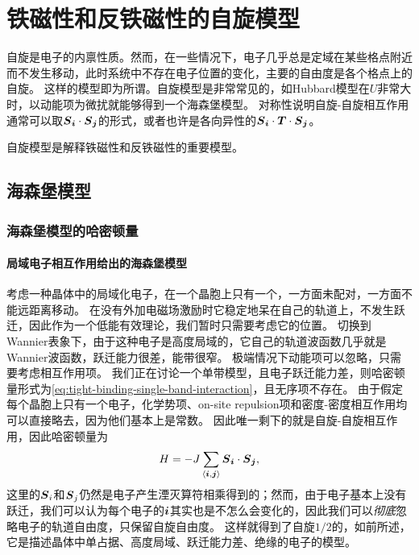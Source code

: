 \chapter{铁磁性和反铁磁性的自旋模型}\label{chap:magnetic}

自旋是电子的内禀性质。然而，在一些情况下，电子几乎总是定域在某些格点附近而不发生移动，此时系统中不存在电子位置的变化，主要的自由度是各个格点上的自旋。
这样的模型即为所谓。自旋模型是非常常见的，如Hubbard模型在$U$非常大时，以动能项为微扰就能够得到一个海森堡模型。
对称性说明自旋-自旋相互作用通常可以取$\vb*{S}_{\vb*{i}} \cdot \vb*{S}_{\vb*{j}}$的形式，或者也许是各向异性的$\vb*{S}_{\vb*{i}} \cdot \vb*{T} \cdot \vb*{S}_{\vb*{j}}$。

自旋模型是解释铁磁性和反铁磁性的重要模型。

\section{海森堡模型}

\subsection{海森堡模型的哈密顿量}

\subsubsection{局域电子相互作用给出的海森堡模型}

考虑一种晶体中的局域化电子，在一个晶胞上只有一个，一方面未配对，一方面不能远距离移动。
在没有外加电磁场激励时它稳定地呆在自己的轨道上，不发生跃迁，因此作为一个低能有效理论，我们暂时只需要考虑它的位置。
切换到Wannier表象下，由于这种电子是高度局域的，它自己的轨道波函数几乎就是Wannier波函数，跃迁能力很差，能带很窄。
极端情况下动能项可以忽略，只需要考虑相互作用项。
我们正在讨论一个单带模型，且电子跃迁能力差，则哈密顿量形式为\eqref{eq:tight-binding-single-band-interaction}，且无序项不存在。
由于假定每个晶胞上只有一个电子，化学势项、on-site repulsion项和密度-密度相互作用均可以直接略去，因为他们基本上是常数。
因此唯一剩下的就是自旋-自旋相互作用，因此哈密顿量为
\begin{equation}
    H = - J \sum_{\langle \vb*{i}, \vb*{j} \rangle} \vb*{S}_{\vb*{i}} \cdot \vb*{S}_{\vb*{j}},
    \label{eq:heisenberg-nearest}
\end{equation}
这里的$\vb*{S}_i$和$\vb*{S}_j$仍然是电子产生湮灭算符相乘得到的；然而，由于电子基本上没有跃迁，我们可以认为每个电子的$\vb*{i}$其实也是不怎么会变化的，因此我们可以\emph{彻底}忽略电子的轨道自由度，只保留自旋自由度。
这样就得到了自旋$1/2$的，如前所述，它是描述晶体中单占据、高度局域、跃迁能力差、绝缘的电子的模型。


